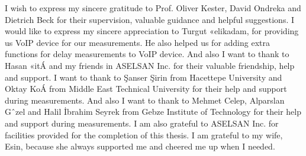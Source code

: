 I wish to express my sincere gratitude to Prof. Oliver Kester, David Ondreka and Dietrich Beck for their supervision, valuable guidance and helpful suggestions.
I would like to express my sincere appreciation to Turgut «elikadam, for providing us VoIP device for our measurements. He also helped us for adding extra functions for delay measurements to VoIP device. And also I want to thank to Hasan «itÁ and my friends in ASELSAN Inc. for their valuable friendship, help and support. I
want to thank to Şanser Şirin from Hacettepe University and Oktay KoÁ from Middle East Technical University for their help and support during measurements. And also I want to thank to Mehmet Celep, Alparslan Gˆzel and Halil İbrahim Seyrek from Gebze Institute of Technology for their help and support during measurements. I am also grateful to ASELSAN Inc. for facilities provided for the completion of this thesis.
I am grateful to my wife, Esin, because she always supported me and cheered me up when I needed. 